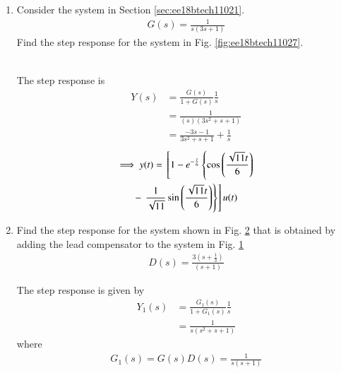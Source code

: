 \begin{enumerate}[label=\thesection.\arabic*.,ref=\thesection.\theenumi]

\item Consider the system in Section \ref{sec:ee18btech11021}.  
\begin{align}
G(s) = \frac{1}{s(3s+1)}
\end{align}
Find the step response for the system in Fig. \ref{fig:ee18btech11027}.
%
\begin{figure}[!ht]
\begin{center}
\resizebox{\columnwidth}{!}{}
\end{center}
\caption{}
\label{fig:ee18btech11027_gs}
\end{figure}
%
\\
\solution The step response is
\begin{align}
Y(s) &= \frac{G(s)}{1+G(s)}\frac{1}{s}\\
&= \frac{1}{(s)(3s^2+s+1)}\\
&= \frac{-3s-1}{3s^2+s+1} + \frac{1}{s} 
\end{align}
\begin{multline}
\implies         y(t) = {}\left[1 - e^{-\frac{t}{6}}\left\{\cos\left(\frac{\sqrt{11}t}{6}\right)\right.\right.
\\
-{}\left. \left.\frac{1}{\sqrt{11}}\sin\left(\frac{\sqrt{11}t}{6}\right)\right\} \right]u(t)
\end{multline}

\item Find the step response for the system shown in Fig. \ref{fig:ee18btech11027_gs_ds} that is  
obtained by adding the lead compensator to the system in Fig. \ref{fig:ee18btech11027_gs}
\begin{align}
D(s) = \frac{3(s+\frac{1}{3})}{(s+1)}
\end{align}
%
%
\begin{figure}[!ht]
\begin{center}
\resizebox{\columnwidth}{!}{}
\end{center}
\caption{}
\label{fig:ee18btech11027_gs_ds}
\end{figure}
\solution The step response is given by 
\begin{align}
Y_{1}(s) &=\frac{G_{1}(s)}{1+G_{1}(s)}\frac{1}{s}\\
&=\frac{1}{s(s^2+s+1)}
\end{align}
%
where
\begin{align}
G_{1}(s) = G(s)D(s)=\frac{1}{s(s+1)}
\end{align}


\end{enumerate}

